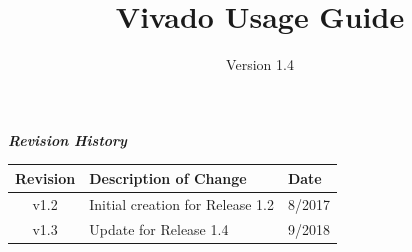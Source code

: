 \def\docTitle{Vivado Usage Guide}
\def\docVersion{1.4}

\date{Version \docVersion} %
\title{\docTitle}
\lhead{\small{\docTitle}}
\usepackage{enumitem}

\maketitle
\thispagestyle{fancy}
\newpage
\begin{center}
  \textit{\textbf{Revision History}}
  \begin{table}[H]
    \begin{tabularx}{\textwidth}{|c|X|l|}
      \hline
      \rowcolor{blue}
      \textbf{Revision} & \textbf{Description of Change} & \textbf{Date} \\
      \hline
      v1.2 & Initial creation for Release 1.2 & 8/2017 \\
      \hline
      v1.3 & Update for Release 1.4 & 9/2018 \\
      \hline
    \end{tabularx}
  \end{table}

\end{center}
\newpage

